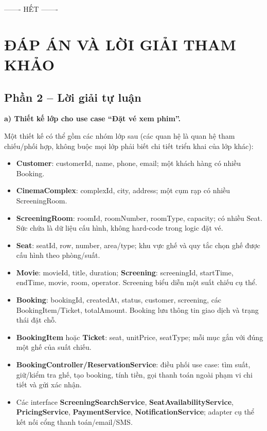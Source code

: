 \documentclass[11pt,a4paper]{article}
\begin{document}
\par\vspace{6pt}\noindent\hfill ------- HẾT -------\hfill\null


\newpage
\section*{ĐÁP ÁN VÀ LỜI GIẢI THAM KHẢO}
\subsection*{Phần 2 -- Lời giải tự luận}
\textbf{a) Thiết kế lớp cho use case ``Đặt vé xem phim''.}

Một thiết kế có thể gồm các nhóm lớp sau (các quan hệ là quan hệ tham chiếu/phối hợp, không buộc mọi lớp phải biết chi tiết triển khai của lớp khác):
\begin{itemize}[leftmargin=1.05cm,itemsep=1pt]
  \item \textbf{Customer}: customerId, name, phone, email; một khách hàng có nhiều Booking.
  \item \textbf{CinemaComplex}: complexId, city, address; một cụm rạp có nhiều ScreeningRoom.
  \item \textbf{ScreeningRoom}: roomId, roomNumber, roomType, capacity; có nhiều Seat. Sức chứa là dữ liệu cấu hình, không hard-code trong logic đặt vé.
  \item \textbf{Seat}: seatId, row, number, area/type; khu vực ghế và quy tắc chọn ghế được cấu hình theo phòng/suất.
  \item \textbf{Movie}: movieId, title, duration; \textbf{Screening}: screeningId, startTime, endTime, movie, room, operator. Screening biểu diễn một suất chiếu cụ thể.
  \item \textbf{Booking}: bookingId, createdAt, status, customer, screening, các BookingItem/Ticket, totalAmount. Booking lưu thông tin giao dịch và trạng thái đặt chỗ.
  \item \textbf{BookingItem} hoặc \textbf{Ticket}: seat, unitPrice, seatType; mỗi mục gắn với đúng một ghế của suất chiếu.
  \item \textbf{BookingController/ReservationService}: điều phối use case: tìm suất, giữ/kiểm tra ghế, tạo booking, tính tiền, gọi thanh toán ngoài phạm vi chi tiết và gửi xác nhận.
  \item Các interface \textbf{ScreeningSearchService}, \textbf{SeatAvailabilityService}, \textbf{PricingService}, \textbf{PaymentService}, \textbf{NotificationService}; adapter cụ thể kết nối cổng thanh toán/email/SMS.
\end{itemize}
\end{document}
